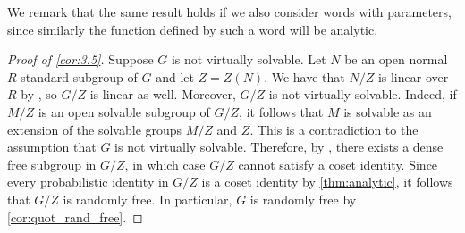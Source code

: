 \documentclass[a4paper,10pt]{amsart}
\theoremstyle{plain}
\theoremstyle{definition}
\numberwithin{equation}{section}
\begin{document}
We remark that the same result holds if we also consider words with parameters, since similarly the function defined by such a word will be analytic.

\begin{proof}[Proof of \cref{cor:3.5}]
    Suppose $G$ is not virtually solvable. Let $N$ be an open normal $R$-standard subgroup of $G$ and let $Z=Z(N)$. We have that $N/Z$ is linear over $R$ by \cite[Proposition 5.1]{JZ02}, so $G/Z$ is linear as well. Moreover, $G/Z$ is not virtually solvable. Indeed, if $M/Z$ is an open solvable subgroup of $G/Z$, it follows that $M$ is solvable as an extension of the solvable groups $M/Z$ and $Z$. This is a contradiction to the assumption that $G$ is not virtually solvable. Therefore, by \cite[Theorem 1.3]{BG}, there exists a dense free subgroup in $G/Z$, in which case $G/Z$ cannot satisfy a coset identity. Since every probabilistic identity in $G/Z$ is a coset identity by \cref{thm:analytic}, it follows that $G/Z$ is randomly free. In particular, $G$ is randomly free by \cref{cor:quot_rand_free}.
\end{proof}
\end{document}
